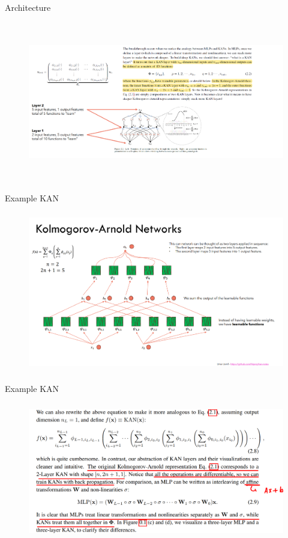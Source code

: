 \documentclass[serif, aspectratio=169]{beamer}
\begin{document}
\begin{frame}{Architecture}
    \begin{figure}
        \centering
        \includegraphics[height=7cm]{image copy 9.png}
    \end{figure}
\end{frame}
\begin{frame}{Example KAN}
    \begin{figure}
        \centering
        \includegraphics[height=7cm]{image copy 8.png}
    \end{figure}
\end{frame}
\begin{frame}{Example KAN}
    \begin{figure}
        \centering
        \includegraphics[height=6cm]{image copy 12.png}
    \end{figure}
\end{frame}
\end{document}
